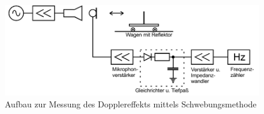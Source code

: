 \begin{figure}
  \includegraphics[width = \textwidth]{./Abbildungen/Schwebung.PNG}
  \caption{Aufbau zur Messung des Dopplereffekts mittels Schwebungsmethode}
  \label{fig:Schwebung}
\end{figure}
